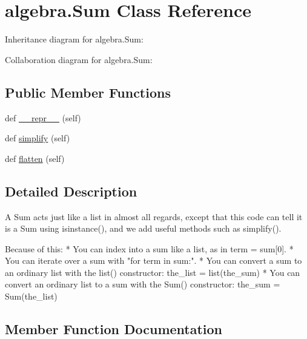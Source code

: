\hypertarget{classalgebra_1_1_sum}{}\section{algebra.\+Sum Class Reference}
\label{classalgebra_1_1_sum}


Inheritance diagram for algebra.\+Sum\+:


Collaboration diagram for algebra.\+Sum\+:
\subsection*{Public Member Functions}
\begin{DoxyCompactItemize}
\item 
def \hyperlink{classalgebra_1_1_sum_a841f362488110cc4eb90a9d1da422759}{\+\_\+\+\_\+repr\+\_\+\+\_\+} (self)
\item 
def \hyperlink{classalgebra_1_1_sum_acf943c215b2493f954d12057fdcfb2f5}{simplify} (self)
\item 
def \hyperlink{classalgebra_1_1_sum_ae1f037128c76fce074f14c134e250d3f}{flatten} (self)
\end{DoxyCompactItemize}


\subsection{Detailed Description}
\begin{DoxyVerb}A Sum acts just like a list in almost all regards, except that this code
can tell it is a Sum using isinstance(), and we add useful methods
such as simplify().

Because of this:
  * You can index into a sum like a list, as in term = sum[0].
  * You can iterate over a sum with "for term in sum:".
  * You can convert a sum to an ordinary list with the list() constructor:
     the_list = list(the_sum)
  * You can convert an ordinary list to a sum with the Sum() constructor:
     the_sum = Sum(the_list)
\end{DoxyVerb}
 

\subsection{Member Function Documentation}
\hypertarget{classalgebra_1_1_sum_a841f362488110cc4eb90a9d1da422759}{}
